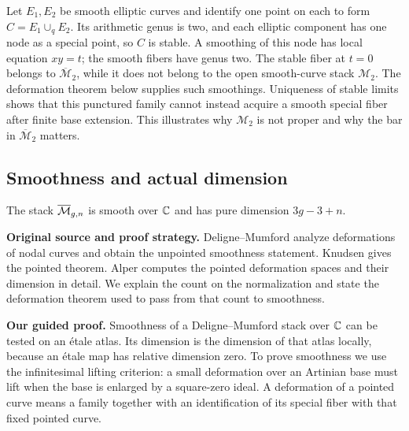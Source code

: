 \begin{Ex}
Let $E_1,E_2$ be smooth elliptic curves and identify one point
on each to form $C=E_1\cup_qE_2$. Its arithmetic genus is two,
and each elliptic component has one node as a special point,
so $C$ is stable. A smoothing of this node has local equation
$xy=t$; the smooth fibers have genus two. The stable fiber at
$t=0$ belongs to $\overline{\mathcal M}_2$, while it does not
belong to the open smooth-curve stack $\mathcal M_2$.
The deformation theorem below supplies such smoothings. Uniqueness
of stable limits shows that this punctured family cannot instead
acquire a smooth special fiber after finite base extension.
This illustrates why $\mathcal M_2$ is not proper and why the
bar in $\overline{\mathcal M}_2$ matters.
\end{Ex}

\subsection{Smoothness and actual dimension}

\begin{Prop}\label{prop:curves-smooth}
The stack $\overline{\mathcal M}_{g,n}$ is smooth over $\mathbb C$ and has pure dimension
$3g-3+n$.
\end{Prop}

\noindent\textbf{Original source and proof strategy.}
Deligne--Mumford \cite[Lemmas (1.3)--(1.4), Proposition (1.5),
pp.~79--82, and Theorem (5.2), pp.~104--105]{DM} analyze
deformations of nodal curves and obtain the unpointed smoothness
statement. Knudsen \cite[Theorem 2.7, p.~179]{Knudsen} gives the
pointed theorem. Alper \cite[Propositions 6.3.26 and 6.3.28,
pp.~232--235; Theorem 6.4.16, p.~241]{Alper} computes the
pointed deformation spaces and their dimension in detail.
We explain the count on the normalization and state the deformation
theorem used to pass from that count to smoothness.

\medskip
\noindent\textbf{Our guided proof.}
Smoothness of a Deligne--Mumford stack over $\mathbb C$ can be tested
on an \'etale atlas. Its dimension is the dimension of that atlas
locally, because an \'etale map has relative dimension zero.
To prove smoothness we use the infinitesimal lifting criterion:
a small deformation over an Artinian base must lift when the base
is enlarged by a square-zero ideal. A deformation of a pointed
curve means a family together with an identification of its special
fiber with that fixed pointed curve.

